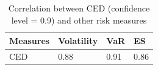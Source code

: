 \begin{table}[!h]
\caption{Correlation between CED (confidence level = 0.9) and other risk measures}
\centering 
\begin{tabular}{ p{2cm}||p{2cm}|p{2cm}|p{2cm}} 
\hline
Measures & Volatility & VaR & ES\\
  \hline
CED & 0.88 & 0.91 & 0.86  \\
\hline
\end{tabular}
\label{table:corrRiskMeasure}
\end{table}

